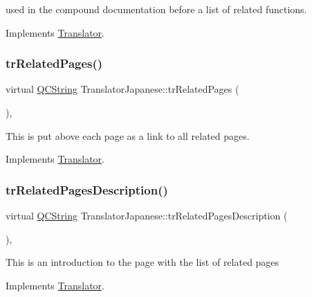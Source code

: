 used in the compound documentation before a list of related functions. 

Implements \mbox{\hyperlink{class_translator}{Translator}}.

\mbox{\label{class_translator_japanese_a107f31a390f322d8d20c73ac5732f249}} 
\subsubsection{\texorpdfstring{trRelatedPages()}{trRelatedPages()}}
{\footnotesize\ttfamily virtual \mbox{\hyperlink{class_q_c_string}{Q\+C\+String}} Translator\+Japanese\+::tr\+Related\+Pages (\begin{DoxyParamCaption}{ }\end{DoxyParamCaption})\hspace{0.3cm}{\ttfamily [inline]}, {\ttfamily [virtual]}}

This is put above each page as a link to all related pages. 

Implements \mbox{\hyperlink{class_translator}{Translator}}.

\mbox{\label{class_translator_japanese_adf7b56555d2ab0c6a0263cdf785ce3f3}} 
\subsubsection{\texorpdfstring{trRelatedPagesDescription()}{trRelatedPagesDescription()}}
{\footnotesize\ttfamily virtual \mbox{\hyperlink{class_q_c_string}{Q\+C\+String}} Translator\+Japanese\+::tr\+Related\+Pages\+Description (\begin{DoxyParamCaption}{ }\end{DoxyParamCaption})\hspace{0.3cm}{\ttfamily [inline]}, {\ttfamily [virtual]}}

This is an introduction to the page with the list of related pages 

Implements \mbox{\hyperlink{class_translator}{Translator}}.

\mbox{\label{class_translator_japanese_ab68faec70a1979ff9b2b8d754b8cbf30}} 

